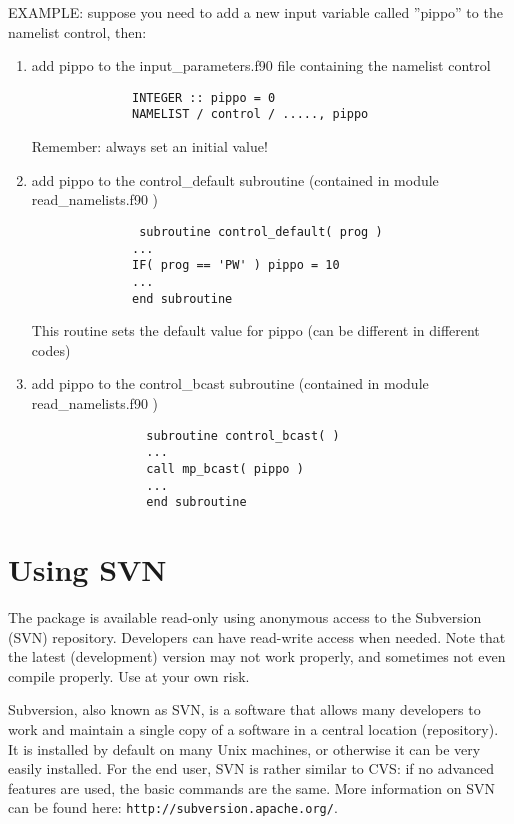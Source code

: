 \documentclass[12pt,a4paper]{article}
\begin{document}
EXAMPLE:
suppose you need to add a new input variable called ''pippo''
to the namelist control, then:

\begin{enumerate}
\item add pippo to the input\_parameters.f90 file containing the
namelist control 
\begin{verbatim}
              INTEGER :: pippo = 0
              NAMELIST / control / ....., pippo
\end{verbatim}
Remember: always set an initial value!

\item add pippo to the control\_default subroutine (contained in
module read\_namelists.f90 ) 
\begin{verbatim}
               subroutine control_default( prog )
              ...
              IF( prog == 'PW' ) pippo = 10
              ...
              end subroutine
\end{verbatim}
This routine sets the default value for pippo (can be different in
different codes) 

\item add pippo to the control\_bcast subroutine (contained in module
read\_namelists.f90 ) 
 \begin{verbatim}
                subroutine control_bcast( )
                ...
                call mp_bcast( pippo )
                ...
                end subroutine
\end{verbatim}
\end{enumerate}
 
\section{ Using SVN}
\label{Sec:SVN}
The package is available read-only using anonymous access to the Subversion 
(SVN) repository. Developers can have read-write access when needed. Note 
that the latest (development) version may not work properly, and sometimes 
not even compile properly. Use at your own risk. 

Subversion, also known as SVN, is a software that allows many
developers to work and maintain a single copy of a software in a
central location (repository).
It is installed by default on many Unix machines, or otherwise 
it can be very easily installed.
For the end user, SVN is rather similar to CVS:
if no advanced features are used, the basic commands are the same.
More information on SVN can be found here: 
\texttt{http://subversion.apache.org/}.
\end{document}
